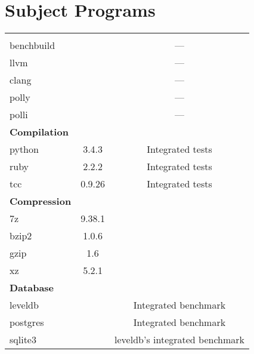 \section{Subject Programs}
\begin{table}[H]
    \myfloatalign
    \begin{tabularx}{\textwidth}{lcC} \toprule
         &  & \\
        \midrule
        \\
        benchbuild &  & ---\\
        llvm &  & ---\\
        clang &  & ---\\
        polly &  & ---\\
        polli &  & ---\\
        \midrule
        \textbf{Compilation}\\
        python & 3.4.3 & Integrated tests\\
        ruby & 2.2.2 & Integrated tests\\
        tcc & 0.9.26 & Integrated tests\\
        \midrule
        \textbf{Compression}\\
        7z & 9.38.1 & \\
        bzip2 & 1.0.6 & \\
        gzip & 1.6 & \\
        xz & 5.2.1 & \\
        \midrule
        \textbf{Database}\\
        leveldb &  & Integrated benchmark\\
        postgres & & Integrated benchmark\\
        sqlite3 &  & leveldb's integrated benchmark\\

\end{tabularx}
\end{table}
